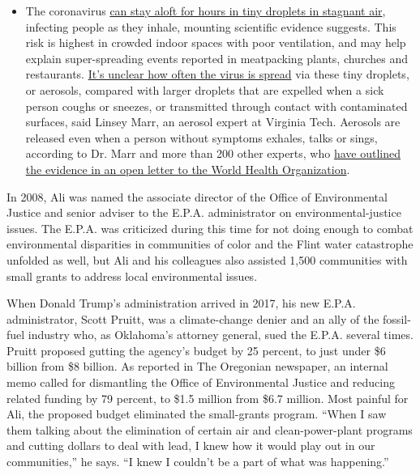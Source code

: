 \begin{itemize}
  \begin{itemize}
  \tightlist
  \item
    The coronavirus
    \href{https://www.nytimes.com/2020/07/04/health/239-experts-with-one-big-claim-the-coronavirus-is-airborne.html?action=click\&pgtype=Article\&state=default\&region=MAIN_CONTENT_3\&context=storylines_faq}{can
    stay aloft for hours in tiny droplets in stagnant air}, infecting
    people as they inhale, mounting scientific evidence suggests. This
    risk is highest in crowded indoor spaces with poor ventilation, and
    may help explain super-spreading events reported in meatpacking
    plants, churches and restaurants.
    \href{https://www.nytimes.com/2020/07/06/health/coronavirus-airborne-aerosols.html?action=click\&pgtype=Article\&state=default\&region=MAIN_CONTENT_3\&context=storylines_faq}{It's
    unclear how often the virus is spread} via these tiny droplets, or
    aerosols, compared with larger droplets that are expelled when a
    sick person coughs or sneezes, or transmitted through contact with
    contaminated surfaces, said Linsey Marr, an aerosol expert at
    Virginia Tech. Aerosols are released even when a person without
    symptoms exhales, talks or sings, according to Dr. Marr and more
    than 200 other experts, who
    \href{https://academic.oup.com/cid/article/doi/10.1093/cid/ciaa939/5867798}{have
    outlined the evidence in an open letter to the World Health
    Organization}.
  \end{itemize}
\end{itemize}

In 2008, Ali was named the associate director of the Office of
Environmental Justice and senior adviser to the E.P.A. administrator on
environmental-justice issues. The E.P.A. was criticized during this time
for not doing enough to combat environmental disparities in communities
of color and the Flint water catastrophe unfolded as well, but Ali and
his colleagues also assisted 1,500 communities with small grants to
address local environmental issues.

When Donald Trump's administration arrived in 2017, his new E.P.A.
administrator, Scott Pruitt, was a climate-change denier and an ally of
the fossil-fuel industry who, as Oklahoma's attorney general, sued the
E.P.A. several times. Pruitt proposed gutting the agency's budget by 25
percent, to just under \$6 billion from \$8 billion. As reported in The
Oregonian newspaper, an internal memo called for dismantling the Office
of Environmental Justice and reducing related funding by 79 percent, to
\$1.5 million from \$6.7 million. Most painful for Ali, the proposed
budget eliminated the small-grants program. ``When I saw them talking
about the elimination of certain air and clean-power-plant programs and
cutting dollars to deal with lead, I knew how it would play out in our
communities,'' he says. ``I knew I couldn't be a part of what was
happening.''

